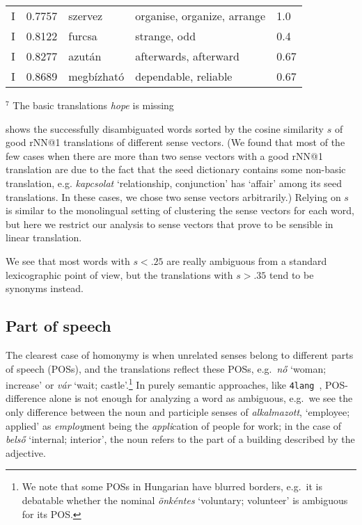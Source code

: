 \documentclass[11pt]{article}
\newcommand{\fl}{\texttt{4lang}}
\newcommand{\todo}[1]{}
\begin{document}
\begin{table*}
{\begin{tabular}{lllll}
    I	& 0.7757	& szervez	& organise, organize, arrange	& 1.0 \\
    I	& 0.8122	& furcsa	& strange, odd	& 0.4 \\
    I	& 0.8277	& azután	& afterwards, afterward	& 0.67 \\
    I	& 0.8689	& megbízható	& dependable, reliable	& 0.67 \\
    \bottomrule
  \end{tabular}
    }
  \caption{Hungarian words with the rNN@1 translations of their sense vectors.
  The first column is a post-hoc annotation by András Kornai (\emph E error in
  translation, \emph I identical, \emph S separate meanings), $s$ is the cosine
  similarity of the translations, and \emph{covg} denotes the coverage of the
  @1 translations over all gold (good) translations.}
  \label{tab:alkoto} 
  {\footnotesize $^7$ The basic translations \emph{hope} is missing}
    \end{table*}

 shows the successfully disambiguated words sorted by the
cosine similarity $s$ of good rNN@1 translations of different sense vectors. (We
found that most of the few cases when there are more than two sense vectors
with a good rNN@1 translation are due to the fact that the seed dictionary
contains some non-basic translation, e.g. \emph{kapcsolat} `relationship,
conjunction' has `affair' among its seed translations. In these cases, we chose
two sense vectors arbitrarily.\todo{When there are sense vectors with more than
two rNN@$k$ hits , the choice of the corresponding target words is also
arbitrary.})  Relying on $s$ is similar to the monolingual setting of
clustering the sense vectors for each word, but here we restrict our analysis
to sense vectors that prove to be sensible in linear translation.

We see that most words with $s<.25$ are really ambiguous from a standard
lexicographic point of view, but the translations with $s>.35$ tend to be
synonyms instead.


\subsection{Part of speech}

The clearest case of homonymy is when unrelated senses belong to different
parts of speech (POSs), and the translations reflect these POSs, e.g.~\emph{nő}
`woman; increase' or \emph{vár} \todo{update examples} `wait;
castle'.\footnote{We note that some POSs in Hungarian have blurred borders,
e.g.~it is debatable whether the nominal \emph{önkéntes} `voluntary; volunteer'
is ambiguous for its POS.} In purely semantic approaches, like
\fl~\citep{Kornai:2018,Kornai:2015a}, POS-difference alone is not enough for
analyzing a word as ambiguous, e.g.~we see the only difference between the noun
and participle senses of \emph{alkalmazott}, `employee; applied' as 
\emph{employ}ment being the \emph{appli}cation of people for work; in the case of
\emph{belső} `internal; interior', the noun refers to the part of a building
described by the adjective.
\end{document}
